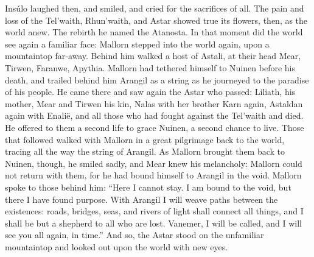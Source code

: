 \documentclass[smalldemyvopaper,11pt,twoside,onecolumn,openright,extrafontsizes]{memoir}
\begin{document}
{{	Insúlo laughed then, and smiled, and cried for the sacrifices of all. The pain and loss of the Tel’waith, Rhun’waith, and Astar showed true its flowers, then, as the world anew. The rebirth he named the Atanosta. In that moment did the world see again a familiar face: Mallorn stepped into the world again, upon a mountaintop far-away. Behind him walked a host of Astali, at their head Mear, Tirwen, Faranwe, Apythia. Mallorn had tethered himself to Nuinen before his death, and trailed behind him Arangil as a string as he journeyed to the paradise of his people. He came there and saw again the Astar who passed: Liliath, his mother, Mear and Tirwen his kin, Nalas with her brother Karn again, Astaldan again with Enalië, and all those who had fought against the Tel’waith and died. He offered to them a second life to grace Nuinen, a second chance to live. Those that followed walked with Mallorn in a great pilgrimage back to the world, tracing all the way the string of Arangil. As Mallorn brought them back to Nuinen, though, he smiled sadly, and Mear knew his melancholy: Mallorn could not return with them, for he had bound himself to Arangil in the void. Mallorn spoke to those behind him:
“Here I cannot stay. I am bound to the void, but there I have found purpose. With Arangil I will weave paths between the existences: roads, bridges, seas, and rivers of light shall connect all things, and I shall be but a shepherd to all who are lost. Vanemer, I will be called, and I will see you all again, in time.”
And so, the Astar stood on the unfamiliar mountaintop and looked out upon the world with new eyes.

}}
\end{document}

